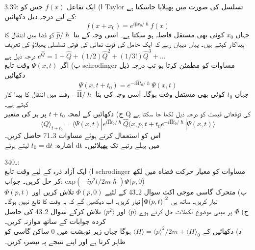  3.39:
ا) ایک تفاعل
 \(f(x)\)
 جس کو Taylor تسلسل کی صورت میں پھیلایا جاسکتا ہے کے لیے درجہ ذيل  دکھائیں:\\
\[f(x+x_{0})=e^{i\hat{p}x_{0}/\hslash}f(x)\]
جہاں
\(x_{0}\)
کوئی بھی مستقل فاصلہ ہو سکتا ہے۔ اسی وجہ کے بنا 
\(\hat{p}/\hslash\)
کو فضا میں  انتقال کا پیداکار کہتے ہیں۔ یہاں دیہان رہے کہ ایک حامل کی قوت نمائی کی قوتی تسلسلی پھیلاؤ کی تعریف درجہ ذیل ہے
\(e^{\hat{Q}}=1+\hat{Q}+(1/2)\hat{Q}^{2}+(1/3!)\hat{Q}^{3}+\dotsc\)\\
ب) اگر
\(\Psi(x,t)\)
وقت تابع schrodinger مساوات کو مطمئن کرتا ہو تب درجہ ذیل دکھائیں\\
\[\Psi(x,t+t_{0})=e^{-i\hat{\text{H}}t_{0}/\hslash}\Psi(x,t)\]
جہاں
\(t_{0}\)
کوئی بھی مستقل وقت ہوگا۔ اسی وجہ کی بنا
\(-\hat{\text{H}}/\hslash\)
وقت میں انتقال کا پیدا کار کہتے ہے۔\\
ج) دکھائیں کے لمحہ
\(t+t_{0}\)
پر ہر کی متغير Q کی توقعاتی قیمت کو درجہ ذيل لکھا جا سکتا ہے\\
\[\langle Q \rangle _{t+t_{0}}=\langle \Psi(x,t)|e^{i\hat{\text{H}}t_{0}/\hslash}\hat{Q}(x,p,t+t_{0}e^{-i\hat{\text{H}}t_{0}/\hslash}|\Psi(x,t)\rangle\]
اس کو استعمال کرتے ہوئے مساوات 3۔71 حاصل كریں۔\\
اشاره:
 \(t_{0}=\dif{t}\) 
لیتے ہوئے dt میں پہلے رتبے تک پھیلائیں۔

 3۔40:\\
ا) ایک آزاد ذرہ کے لیے وقت تابع schrodinger مساوات کو معیار حرکت فضاه میں لکھ کر حل کریں۔
جواب:  
\(\text{exp}(-ip^{2}t/2m\hslash)\Phi(p,0\))\\
ب) متحرک گاسی موجی اکٹ سوال 2۔43 کے لئیے
\(\Phi(p,0)\)
تلاش كريں اور
\(\Phi(p,t)\)
تیار كریں۔ ساتھ ہی
\(\abs{\Phi(p,t)}^{2}\)
تیار كريں۔ اب دیکھیں گے کہ یہ وقت کا تابع نہیں ہوگا۔\\
ج)
\(\Phi\)
پر مبنی موضوع تكملات حل کرتے ہوے
\(\langle p \rangle\)
اور
\(\langle p^{2} \rangle\)
تلاش کرکے سوال 2۔43 کی حاصل كرده جوابات کے ساتھ موازنہ كريں۔\\
د) دکھائیں کے
\(\langle H \rangle =\langle p \rangle ^{2}/2m+\langle H \rangle _{0}\)
ہوگا جہاں زیر نوہشت میں 0 ساکن گاسی کو ظاہر کرتا ہے اور اپنے نتیجے پہ تبصرہ کریں۔


